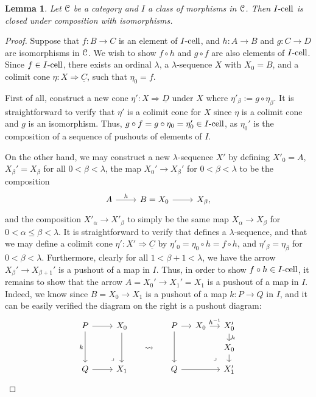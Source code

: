 \documentclass{amsart}
\theoremstyle{plain}
\newtheorem{lemma}[theorem]{Lemma}
\theoremstyle{definition}
\newcommand{\0}{\mathbf{0}}
\newcommand{\cC}{\mathcal C}
\renewcommand{\(}{\left(}
\renewcommand{\)}{\right)}
\def\scr{\EuScript}
\def\cC{\scr{C}}
\newcommand{\cell}{\text-\mathrm{cell}}
\begin{document}
\begin{lemma}\label{I-cell_closed_under_composition_with_isomorphisms}
  Let $\cC$ be a category and $I$ a class of morphisms in $\cC$. Then $I\cell$ is closed under composition with isomorphisms.
\end{lemma}
\begin{proof}
  Suppose that $f:B\to C$ is an element of $I\cell$, and $h:A\to B$ and $g:C\to D$ are isomorphisms in $\cC$. We wish to show $f\circ h$ and $g\circ f$ are also elements of $I\cell$. Since $f\in I\cell$, there exists an ordinal $\lambda$, a $\lambda$-sequence $X$ with $X_0=B$, and a colimit cone $\eta:X\Rightarrow\underline C$, such that $\eta_0=f$. 
  
  First of all, construct a new cone $\eta':X\Rightarrow\underline D$ under $X$ where $\eta'_\beta:=g\circ\eta_\beta$. It is straightforward to verify that $\eta'$ is a colimit cone for $X$ since $\eta$ is a colimit cone and $g$ is an isomorphism. Thus, $g\circ f=g\circ\eta_0=\eta_0'\in I\cell$, as $\eta_0'$ is the composition of a sequence of pushouts of elements of $I$.

  On the other hand, we may construct a new $\lambda$-sequence $X'$ by defining $X'_0=A$, $X_\beta'=X_\beta$ for all $0<\beta<\lambda$, the map $X_0'\to X_\beta'$ for $0<\beta<\lambda$ to be the composition
  \[\begin{tikzcd}
    A & {B=X_0} & {X_\beta},
    \arrow["h", from=1-1, to=1-2]
    \arrow[from=1-2, to=1-3]
  \end{tikzcd}\]
  and the composition $X'_\alpha\to X'_\beta$ to simply be the same map $X_\alpha\to X_\beta$ for $0<\alpha\leq \beta<\lambda$. It is straightforward to verify that defines a $\lambda$-sequence, and that we may define a colimit cone $\eta':X'\Rightarrow\underline C$ by $\eta'_0=\eta_0\circ h=f\circ h$, and $\eta'_\beta=\eta_\beta$ for $0<\beta<\lambda$. Furthermore, clearly for all $1<\beta+1<\lambda$, we have the arrow $X_\beta'\to X_{\beta+1}'$ is a pushout of a map in $I$. Thus, in order to show $f\circ h\in I\cell$, it remains to show that the arrow $A=X_0'\to X_1'=X_1$ is a pushout of a map in $I$. Indeed, we know since $B=X_0\to X_1$ is a pushout of a map $k:P\to Q$ in $I$, and it can be easily verified the diagram on the right is a pushout diagram:
  \[\begin{tikzcd}[row sep=small,column sep=small]
    P && {X_0} && P & {X_0} & {X_0'} \\
    &&& \leadsto &&& {X_0} \\
    Q && {X_1} && Q && {X_1'}
    \arrow[from=1-3, to=3-3]
    \arrow[from=3-1, to=3-3]
    \arrow[from=1-1, to=1-3]
    \arrow["k"', from=1-1, to=3-1]
    \arrow["\ulcorner"{anchor=center, pos=0.125, rotate=180}, draw=none, from=3-3, to=1-1]
    \arrow[from=1-5, to=1-6]
    \arrow["h", from=1-7, to=2-7]
    \arrow[from=2-7, to=3-7]
    \arrow[from=1-5, to=3-5]
    \arrow[from=3-5, to=3-7]
    \arrow["{h^{-1}}", from=1-6, to=1-7]
    \arrow["\ulcorner"{anchor=center, pos=0.125, rotate=180}, draw=none, from=3-7, to=1-5]
  \end{tikzcd}\qedhere\]
\end{proof}
\end{document}
